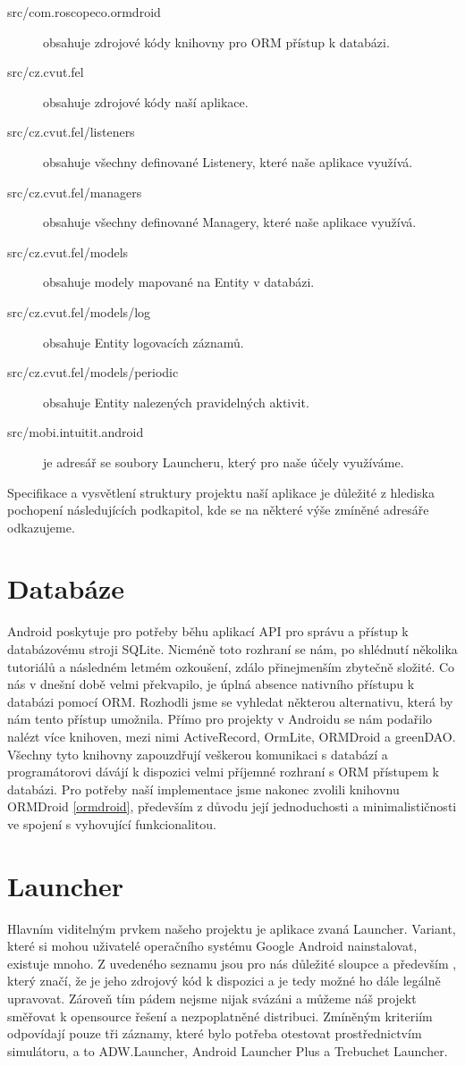 \documentclass[thesis=M,czech]{FITthesis}[2012/06/26]
\begin{document}
\begin{description}
\item[src/com.roscopeco.ormdroid] obsahuje zdrojové kódy knihovny pro ORM přístup k databázi.
\item[src/cz.cvut.fel] obsahuje zdrojové kódy naší aplikace.
\item[src/cz.cvut.fel/listeners] obsahuje všechny definované Listenery, které naše aplikace využívá.
\item[src/cz.cvut.fel/managers] obsahuje všechny definované Managery, které naše aplikace využívá.
\item[src/cz.cvut.fel/models] obsahuje modely mapované na Entity v databázi.
\item[src/cz.cvut.fel/models/log] obsahuje Entity logovacích záznamů.
\item[src/cz.cvut.fel/models/periodic] obsahuje Entity nalezených pravidelných aktivit.
\item[src/mobi.intuitit.android] je adresář se soubory Launcheru, který pro naše účely využíváme.
\end{description}

Specifikace a vysvětlení struktury projektu naší aplikace je důležité z hlediska pochopení následujících podkapitol, kde se na některé výše zmíněné adresáře odkazujeme.

\section{Databáze}
Android poskytuje pro potřeby běhu aplikací API pro správu a přístup k databázovému stroji SQLite. Nicméně toto rozhraní se nám, po shlédnutí několika tutoriálů a následném letmém ozkoušení, zdálo přinejmenším zbytečně složité. Co nás v dnešní době velmi překvapilo, je úplná absence nativního přístupu k databázi pomocí ORM. Rozhodli jsme se vyhledat některou alternativu, která by nám tento přístup umožnila. Přímo pro projekty v Androidu se nám podařilo nalézt více knihoven, mezi nimi ActiveRecord\cite{active_record}, OrmLite\cite{ormlite}, ORMDroid\cite{ormdroid} a greenDAO\cite{greendao}. Všechny tyto knihovny zapouzdřují veškerou komunikaci s databází a programátorovi dávájí k dispozici velmi příjemné rozhraní s ORM přístupem k databázi. Pro potřeby naší implementace jsme nakonec zvolili knihovnu ORMDroid \ref{ormdroid}, především z důvodu její jednoduchosti a minimalističnosti ve spojení s vyhovující funkcionalitou.

\section{Launcher}
Hlavním viditelným prvkem našeho projektu je aplikace zvaná Launcher. Variant, které si mohou uživatelé operačního systému Google Android nainstalovat, existuje mnoho\cite{launchers_list}. Z uvedeného seznamu jsou pro nás důležité sloupce  a především , který značí, že je jeho zdrojový kód k dispozici a je tedy možné ho dále legálně upravovat. Zároveň tím pádem nejsme nijak svázáni a můžeme náš projekt směřovat k opensource řešení a nezpoplatněné distribuci. Zmíněným kriteriím odpovídají pouze tři záznamy, které bylo potřeba otestovat prostřednictvím simulátoru, a to ADW.Launcher, Android Launcher Plus a Trebuchet Launcher.
\end{document}

